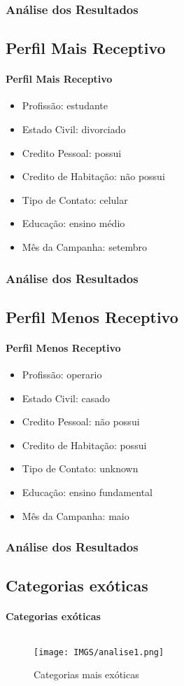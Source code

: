 \documentclass{beamer}
\begin{document}
\begin{frame}
    \frametitle{Análise dos Resultados}  
    \subsection{Perfil Mais Receptivo}
    \framesubtitle{Perfil Mais Receptivo}
    \begin{itemize}
    \item Profissão: estudante
    \item Estado Civil: divorciado
    \item Credito Pessoal: possui
    \item Credito de Habitação: não possui
    \item Tipo de Contato: celular
    \item Educação: ensino médio
    \item Mês da Campanha: setembro
    \end{itemize}
\end{frame}

\begin{frame}
    \frametitle{Análise dos Resultados}  
    \subsection{Perfil Menos Receptivo}
    \framesubtitle{Perfil Menos Receptivo}
    \begin{itemize}
    \item Profissão: operario
    \item Estado Civil: casado
    \item Credito Pessoal: não possui
    \item Credito de Habitação: possui
    \item Tipo de Contato: unknown
    \item Educação: ensino fundamental
    \item Mês da Campanha: maio
    \end{itemize}
\end{frame}


\begin{frame}
	\frametitle{Análise dos Resultados}
    \subsection{Categorias exóticas}
	\framesubtitle{Categorias exóticas}
	\begin{columns}
		\begin{column}{1\textwidth}
			\begin{figure}[H]
				\centerline{\texttt{[image: IMGS/analise1.png]}}
				
				\caption{\label{fig:analise1}Categorias mais exóticas}
			\end{figure}
		\end{column}
	\end{columns}    
\end{frame}
\end{document}

